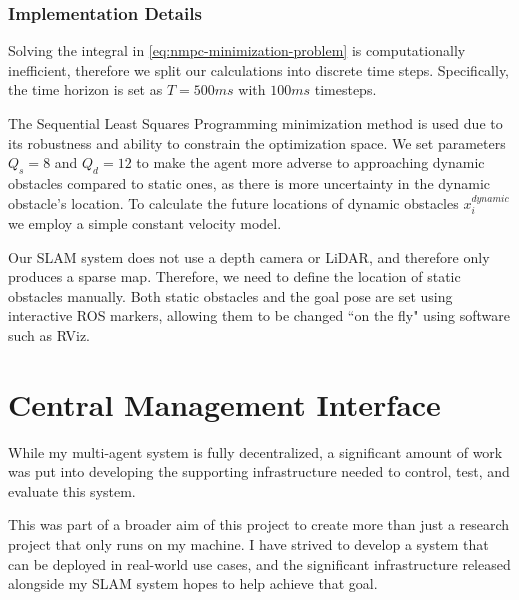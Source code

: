 \subsubsection{Implementation Details}
\label{sec:nmpc-implementation-details}
Solving the integral in \autoref{eq:nmpc-minimization-problem} is computationally inefficient, therefore we split our calculations into discrete time steps. Specifically, the time horizon is set as $T=500ms$ with $100ms$ timesteps.

The Sequential Least Squares Programming minimization method is used due to its robustness and ability to constrain the optimization space. We set parameters $Q_s = 8$ and $Q_d = 12$ to make the agent more adverse to approaching dynamic obstacles compared to static ones, as there is more uncertainty in the dynamic obstacle's location. To calculate the future locations of dynamic obstacles $x_i^{dynamic}$ we employ a simple constant velocity model.

Our SLAM system does not use a depth camera or LiDAR, and therefore only produces a sparse map. Therefore, we need to define the location of static obstacles manually. Both static obstacles and the goal pose are set using interactive ROS markers, allowing them to be changed ``on the fly" using software such as RViz.

\section{Central Management Interface}
\label{sec:central-management-interface}
While my multi-agent system is fully decentralized, a significant amount of work was put into developing the supporting infrastructure needed to control, test, and evaluate this system.

This was part of a broader aim of this project to create more than just a research project that only runs on my machine. I have strived to develop a system that can be deployed in real-world use cases, and the significant infrastructure released alongside my SLAM system hopes to help achieve that goal.

